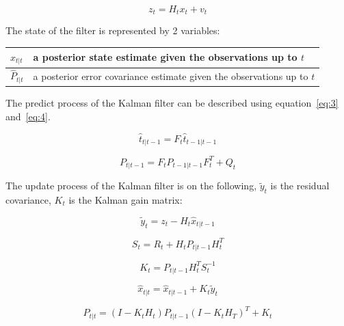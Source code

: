 \documentclass[11pt, a4paper]{article}
\begin{document}
\begin{equation}
	z_t = H_tx_t + v_t
\end{equation}\label{eq:2}

The state of the filter is represented by 2 variables:

\begin{table}[htbp]
 \begin{center}
 	\begin{tabular}{l|l} \hline
 		$\widehat{x}_{t|t} $ & a posterior state estimate given the observations up to $t$ \\ \hline
 		$\widehat{P}_{t|t} $ & a posterior error covariance estimate given the observations up to $t$ \\ \hline
 	\end{tabular}
 
\end{center}
\end{table}

The predict process of the Kalman filter can be described using equation~\ref{eq:3} and~\ref{eq:4}. 

\begin{equation}
	\widehat{t}_{t|t-1} = F_t\widehat{t}_{t-1|t-1} 
\end{equation}\label{eq:3}

\begin{equation}
P_{t|t-1} = F_tP_{t-1|t-1}F_{t}^T + Q_{t}
\end{equation}\label{eq:4}

The update process of the Kalman filter is on the following, $\widetilde{y}_{t}$ is the residual covariance, $K_{t}$ is the Kalman gain matrix:

\begin{equation}
\widetilde{y}_{t} = z_t - H_t\widehat{x}_{t|t-1} \end{equation}

\begin{equation}
S_t = R_t + H_tP_{t|t-1}H_{t}^T \end{equation}

\begin{equation}
K_t = P_{t|t-1}H_{t}^{T}S_{t}^{-1} \end{equation}

\begin{equation}
\widehat{x}_{t|t} = \widehat{x}_{t|t-1}+K_t\widetilde{y}_{t} \end{equation}

\begin{equation}
P_{t|t} = (I - K_tH_t)P_{t|t-1}{(I-K_tH_T)}^{T} + K_t \end{equation}
\end{document}
